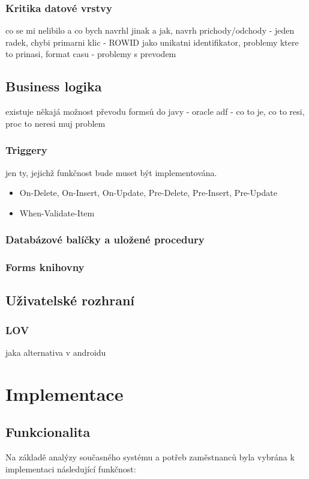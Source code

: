 \documentclass{bakalarka}
\begin{document}
\subsection{Kritika datové vrstvy}
co se mi nelibilo a co bych navrhl jinak a jak, navrh prichody/odchody - jeden radek,
chybi primarni klic - ROWID jako unikatni identifikator, problemy ktere to prinasi,
format casu - problemy s prevodem

\section{Business logika}
existuje někajá možnost převodu formsů do javy - oracle adf - co to je, co to resi, proc to neresi muj problem
\subsection{Triggery}
jen ty, jejichž funkčnost bude muset být implementována.
\begin{itemize}
\item On-Delete, On-Insert, On-Update, Pre-Delete, Pre-Insert, Pre-Update
\item When-Validate-Item
\end{itemize}

\subsection{Databázové balíčky a uložené procedury}

\subsection{Forms knihovny}


\section{Uživatelské rozhraní}
\subsection{LOV}
jaka alternativa v androidu

\chapter{Implementace}

\section{Funkcionalita}
Na základě analýzy současného systému a potřeb zaměstnanců byla vybrána k implementaci následující funkčnost: 
\end{document}
